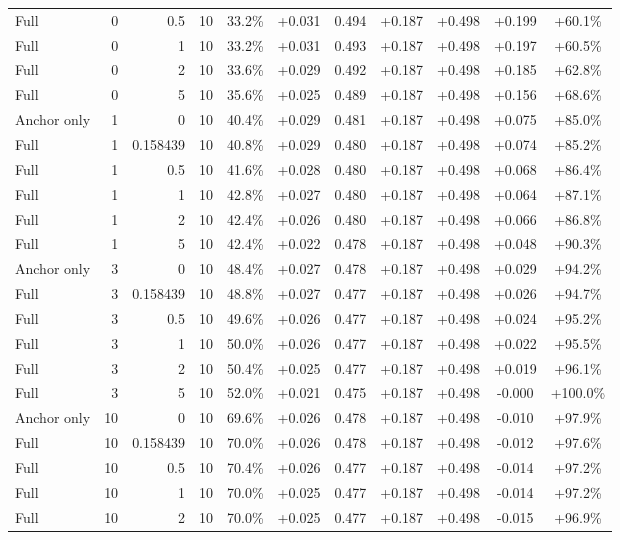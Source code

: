 \begin{table}[htbp]
\begin{tabular}{lrrrccccccc}
Full & 0 & 0.5 & 10 & 33.2\% & +0.031 & 0.494 & +0.187 & +0.498 & +0.199 & +60.1\% \\
Full & 0 & 1 & 10 & 33.2\% & +0.031 & 0.493 & +0.187 & +0.498 & +0.197 & +60.5\% \\
Full & 0 & 2 & 10 & 33.6\% & +0.029 & 0.492 & +0.187 & +0.498 & +0.185 & +62.8\% \\
Full & 0 & 5 & 10 & 35.6\% & +0.025 & 0.489 & +0.187 & +0.498 & +0.156 & +68.6\% \\
Anchor only & 1 & 0 & 10 & 40.4\% & +0.029 & 0.481 & +0.187 & +0.498 & +0.075 & +85.0\% \\
Full & 1 & 0.158439 & 10 & 40.8\% & +0.029 & 0.480 & +0.187 & +0.498 & +0.074 & +85.2\% \\
Full & 1 & 0.5 & 10 & 41.6\% & +0.028 & 0.480 & +0.187 & +0.498 & +0.068 & +86.4\% \\
Full & 1 & 1 & 10 & 42.8\% & +0.027 & 0.480 & +0.187 & +0.498 & +0.064 & +87.1\% \\
Full & 1 & 2 & 10 & 42.4\% & +0.026 & 0.480 & +0.187 & +0.498 & +0.066 & +86.8\% \\
Full & 1 & 5 & 10 & 42.4\% & +0.022 & 0.478 & +0.187 & +0.498 & +0.048 & +90.3\% \\
Anchor only & 3 & 0 & 10 & 48.4\% & +0.027 & 0.478 & +0.187 & +0.498 & +0.029 & +94.2\% \\
Full & 3 & 0.158439 & 10 & 48.8\% & +0.027 & 0.477 & +0.187 & +0.498 & +0.026 & +94.7\% \\
Full & 3 & 0.5 & 10 & 49.6\% & +0.026 & 0.477 & +0.187 & +0.498 & +0.024 & +95.2\% \\
Full & 3 & 1 & 10 & 50.0\% & +0.026 & 0.477 & +0.187 & +0.498 & +0.022 & +95.5\% \\
Full & 3 & 2 & 10 & 50.4\% & +0.025 & 0.477 & +0.187 & +0.498 & +0.019 & +96.1\% \\
Full & 3 & 5 & 10 & 52.0\% & +0.021 & 0.475 & +0.187 & +0.498 & -0.000 & +100.0\% \\
Anchor only & 10 & 0 & 10 & 69.6\% & +0.026 & 0.478 & +0.187 & +0.498 & -0.010 & +97.9\% \\
Full & 10 & 0.158439 & 10 & 70.0\% & +0.026 & 0.478 & +0.187 & +0.498 & -0.012 & +97.6\% \\
Full & 10 & 0.5 & 10 & 70.4\% & +0.026 & 0.477 & +0.187 & +0.498 & -0.014 & +97.2\% \\
Full & 10 & 1 & 10 & 70.0\% & +0.025 & 0.477 & +0.187 & +0.498 & -0.014 & +97.2\% \\
Full & 10 & 2 & 10 & 70.0\% & +0.025 & 0.477 & +0.187 & +0.498 & -0.015 & +96.9\% \\

\end{tabular}
\end{table}
